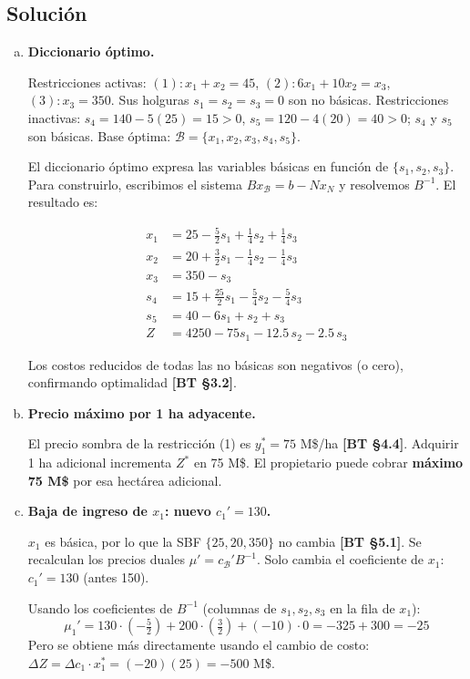 \documentclass{article}
\begin{document}
\subsection*{Solución}

\begin{enumerate}[a)]

\item \textbf{Diccionario óptimo.}

Restricciones activas: $(1): x_1+x_2=45$, $(2): 6x_1+10x_2=x_3$, $(3): x_3=350$. Sus holguras $s_1=s_2=s_3=0$ son no básicas. Restricciones inactivas: $s_4 = 140-5(25)=15>0$, $s_5=120-4(20)=40>0$; $s_4$ y $s_5$ son básicas. Base óptima: $\mathcal{B} = \{x_1, x_2, x_3, s_4, s_5\}$.

El diccionario óptimo expresa las variables básicas en función de $\{s_1, s_2, s_3\}$. Para construirlo, escribimos el sistema $B x_{\mathcal{B}} = b - N x_N$ y resolvemos $B^{-1}$. El resultado es:

\begin{align*}
x_1  &= 25 - \tfrac{5}{2}s_1 + \tfrac{1}{4}s_2 + \tfrac{1}{4}s_3 \\
x_2  &= 20 + \tfrac{3}{2}s_1 - \tfrac{1}{4}s_2 - \tfrac{1}{4}s_3 \\
x_3  &= 350 - s_3 \\
s_4  &= 15 + \tfrac{25}{2}s_1 - \tfrac{5}{4}s_2 - \tfrac{5}{4}s_3 \\
s_5  &= 40 - 6s_1 + s_2 + s_3 \\
Z    &= 4250 - 75s_1 - 12.5\,s_2 - 2.5\,s_3
\end{align*}

Los costos reducidos de todas las no básicas son negativos (o cero), confirmando optimalidad \textbf{[BT §3.2]}.

\item \textbf{Precio máximo por 1 ha adyacente.}

El precio sombra de la restricción (1) es $y_1^* = 75$ M\$/ha \textbf{[BT §4.4]}. Adquirir 1 ha adicional incrementa $Z^*$ en 75 M\$. El propietario puede cobrar \textbf{máximo 75 M\$} por esa hectárea adicional.

\item \textbf{Baja de ingreso de $x_1$: nuevo $c_1' = 130$.}

$x_1$ es básica, por lo que la SBF $\{25, 20, 350\}$ no cambia \textbf{[BT §5.1]}. Se recalculan los precios duales $\mu' = c_{\mathcal{B}}'B^{-1}$. Solo cambia el coeficiente de $x_1$: $c_1' = 130$ (antes 150).

Usando los coeficientes de $B^{-1}$ (columnas de $s_1, s_2, s_3$ en la fila de $x_1$):
\[
  \mu_1' = 130\cdot\left(-\tfrac{5}{2}\right) + 200\cdot\left(\tfrac{3}{2}\right) + (-10)\cdot 0 = -325 + 300 = -25
\]
Pero se obtiene más directamente usando el cambio de costo: $\Delta Z = \Delta c_1 \cdot x_1^* = (-20)(25) = -500$ M\$.


\end{enumerate}
\end{document}
